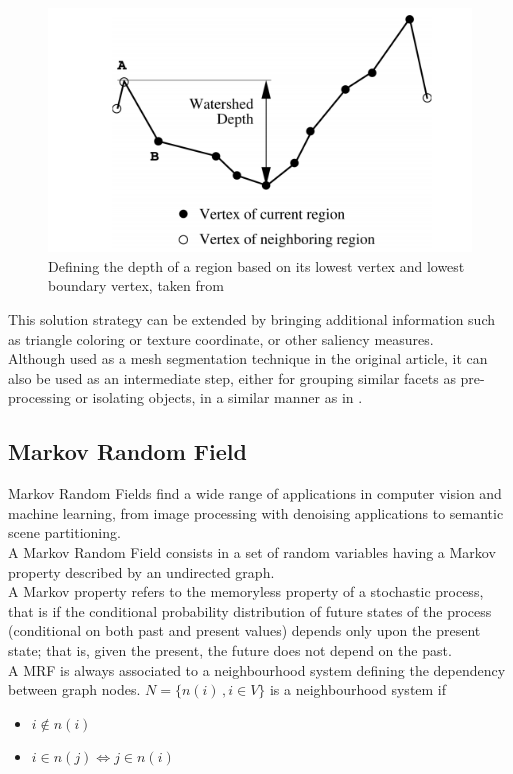 \documentclass{kththesis}
\begin{document}
\begin{figure}[H]
    \centering
    \includegraphics[width=\textwidth]{images/watershed_depth.png}
    \caption{Defining the depth of a region based on its lowest vertex and lowest boundary vertex, taken from \parencite{ManganMeshWatershed}}
    \label{fig:WSdepth}
\end{figure}

This solution strategy can be extended by bringing additional information such as triangle coloring or texture coordinate, or other saliency measures. \\ 
Although used as a mesh segmentation technique in the original article, it can also be used as an intermediate step, either for grouping similar facets as pre-processing or isolating objects, in a similar manner as in \parencite{det_seg_class}. 

\subsection{Markov Random Field} 
\label{sec:MRF}
Markov Random Fields find a wide range of applications in computer vision and machine learning, from image processing with denoising applications to semantic scene partitioning. \\

A Markov Random Field  consists in a set of random variables having a Markov property described by an undirected graph. \\
A Markov property refers to the memoryless property of a stochastic process, that is if the conditional probability distribution of future states of the process (conditional on both past and present values) depends only upon the present state; that is, given the present, the future does not depend on the past. \\ 
A MRF is always associated to a neighbourhood system
defining the dependency between graph nodes.
$N= \{n(i) \,, i \in V \}$ is a neighbourhood system if
\begin{itemize}
    \item $i \notin n(i)$
    \item $i \in n(j) \Leftrightarrow j \in n(i)$
\end{itemize}
\end{document}
